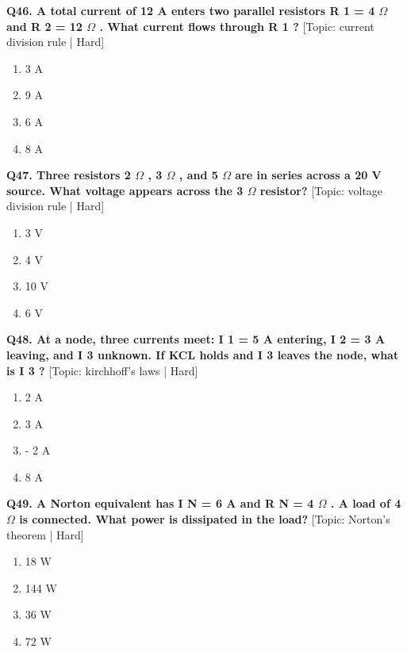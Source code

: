 \noindent\textbf{Q46. A total current of 12 A enters two parallel resistors R 1 = 4 $\Omega$ and R 2 = 12 $\Omega$ . What current flows through R 1 ?} \hfill [Topic: current division rule | Hard]
\begin{enumerate}[label=(\alph*),topsep=2pt,itemsep=1pt,partopsep=0pt,parsep=0pt]
    \item {3 A}
    \item {9 A}
    \item {6 A}
    \item {8 A}
\end{enumerate}
\vspace{2mm}

\noindent\textbf{Q47. Three resistors 2 $\Omega$ , 3 $\Omega$ , and 5 $\Omega$ are in series across a 20 V source. What voltage appears across the 3 $\Omega$ resistor?} \hfill [Topic: voltage division rule | Hard]
\begin{enumerate}[label=(\alph*),topsep=2pt,itemsep=1pt,partopsep=0pt,parsep=0pt]
    \item {3 V}
    \item {4 V}
    \item {10 V}
    \item {6 V}
\end{enumerate}
\vspace{2mm}

\noindent\textbf{Q48. At a node, three currents meet: I 1 = 5 A entering, I 2 = 3 A leaving, and I 3 unknown. If KCL holds and I 3 leaves the node, what is I 3 ?} \hfill [Topic: kirchhoff's laws | Hard]
\begin{enumerate}[label=(\alph*),topsep=2pt,itemsep=1pt,partopsep=0pt,parsep=0pt]
    \item {2 A}
    \item {3 A}
    \item {- 2 A}
    \item {8 A}
\end{enumerate}
\vspace{2mm}

\noindent\textbf{Q49. A Norton equivalent has I N = 6 A and R N = 4 $\Omega$ . A load of 4 $\Omega$ is connected. What power is dissipated in the load?} \hfill [Topic: Norton's theorem | Hard]
\begin{enumerate}[label=(\alph*),topsep=2pt,itemsep=1pt,partopsep=0pt,parsep=0pt]
    \item {18 W}
    \item {144 W}
    \item {36 W}
    \item {72 W}
\end{enumerate}
\vspace{2mm}

